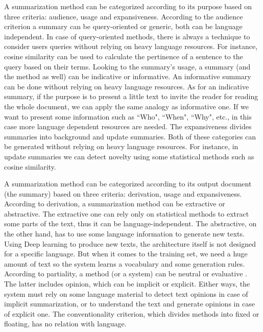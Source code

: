 A summarization method can be categorized according to its purpose based on three criteria: audience, usage and expansiveness.
According to the audience criterion a summary can be query-oriented or generic, both can be language independent.
In case of query-oriented methods, there is always a technique to consider users queries without relying on heavy language resources. 
For instance, cosine similarity can be used to calculate the pertinence of a sentence to the query based on their terms. 
Looking to the summary's usage, a summary (and the method as well) can be indicative or informative.
An informative summary can be done without relying on heavy language resources. 
As for an indicative summary, if the purpose is to present a little text to invite the reader for reading the whole document, we can apply the  same analogy as informative one. 
If we want to present some information such as ``Who", ``When", ``Why", etc., in this case more language dependent resources are needed.
The expansiveness divides summaries into background and update summaries. 
Both of these categories can be generated without relying on heavy language resources.
For instance, in update summaries we can detect novelty using some statistical methods such as cosine similarity.

A summarization method can be categorized according to its output document (the summary) based on three criteria: derivation, usage and expansiveness.
According to derivation, a summarization method can be extractive or abstractive.
The extractive one can rely only on statistical methods to extract some parts of the text, thus it can be language-independent. 
The abstractive, on the other hand, has to use some language information to generate new texts. 
Using Deep learning to produce new texts, the architecture itself is not designed for a specific language. 
But when it comes to the training set, we need a huge amount of text so the system learns a vocabulary and some generation rules. 
According to partiality, a method (or a system) can be neutral or evaluative . 
The latter includes opinion, which can be implicit or explicit. 
Either ways, the system must rely on some language material to detect text opinions in case of implicit summarization, or to understand the text and generate opinions in case of explicit one. 
The conventionality criterion, which divides methods into fixed or floating, has no relation with language. 


